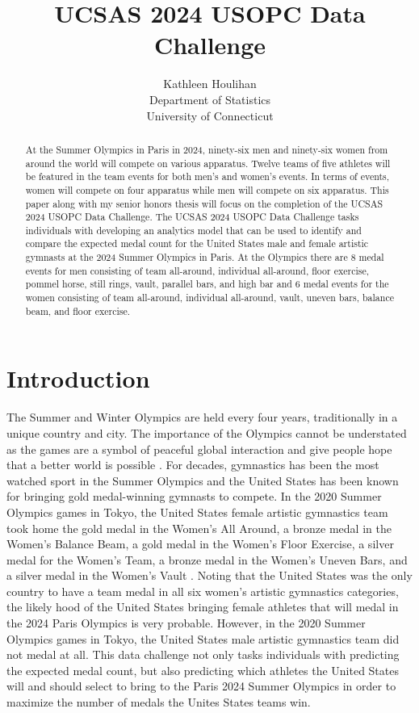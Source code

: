\documentclass[12pt]{article}
\title{UCSAS 2024 USOPC Data Challenge}
\author{Kathleen Houlihan\\
  Department of Statistics\\
  University of Connecticut
}
\begin{document}
\maketitle

\begin{abstract}

  At the Summer Olympics in Paris in 2024, ninety-six men and ninety-six women 
  from around the world will compete on various apparatus. Twelve teams of five athletes will be 
  featured in the team events for both men's and women's events. In terms of events, women
  will compete on four apparatus while men will compete on six apparatus. This paper along 
  with my senior honors thesis will focus on the completion of the UCSAS 2024 USOPC Data Challenge. 
  The UCSAS 2024 USOPC Data Challenge tasks individuals with developing an analytics model that
  can be used to identify and compare the expected medal count for the United States male and 
  female artistic gymnasts at the 2024 Summer Olympics in Paris. At the Olympics there are 8 
  medal events for men consisting of team all-around, individual all-around, floor exercise, 
  pommel horse, still rings, vault, parallel bars, and high bar and 6 medal events for the women 
  consisting of team all-around, individual all-around, vault, uneven bars, balance beam, and 
  floor exercise. 

\end{abstract}

\section{Introduction}
\label{sec:intro}

The Summer and Winter Olympics are held every four years, traditionally in a unique country and city.
 The importance of the Olympics cannot be understated as the games are a symbol of peaceful global 
 interaction and give people hope that a better world is possible \citep{United Nations}. For decades, gymnastics has been 
 the most watched sport in the Summer Olympics and the United States has been known for bringing gold 
 medal-winning gymnasts to compete. In the 2020 Summer Olympics games in Tokyo, the United States 
 female artistic gymnastics team took home the gold medal in the Women's All Around, a bronze medal 
 in the Women's Balance Beam, a gold medal in the Women's Floor Exercise, a silver medal for the Women's
 Team, a bronze medal in the Women's Uneven Bars, and a silver medal in the Women's Vault \citep{Olympics}. 
 Noting that the United States was the only country to have a team medal in all six women's artistic gymnastics 
  categories, the likely hood of the United States bringing female athletes that will medal in the 2024 
  Paris Olympics is very probable. However, in the 2020 Summer Olympics games in Tokyo, the United States 
  male artistic gymnastics team did not medal at all. This data challenge not only tasks individuals 
  with predicting the expected medal count, but also predicting which athletes the United States will 
  and should select to bring to the Paris 2024 Summer Olympics in order to maximize the number of medals 
  the Unites States teams win. 
\end{document}
